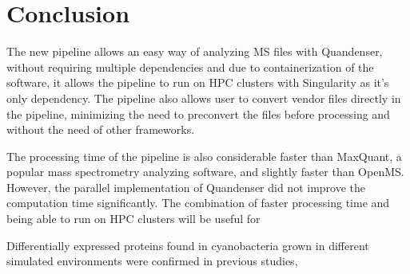 \section{Conclusion}

The new pipeline allows an easy way of analyzing MS files with Quandenser, without requiring multiple dependencies and due to containerization of the software, it allows the pipeline to run on HPC clusters with Singularity as it's only dependency. The pipeline also allows user to convert vendor files directly in the pipeline, minimizing the need to preconvert the files before processing and without the need of other frameworks.

The processing time of the pipeline is also considerable faster than MaxQuant, a popular mass spectrometry analyzing software, and slightly faster than OpenMS. However, the parallel implementation of Quandenser did not improve the computation time significantly. The combination of faster processing time and being able to run on HPC clusters will be useful for

Differentially expressed proteins found in cyanobacteria grown in different simulated environments were confirmed in previous studies,
